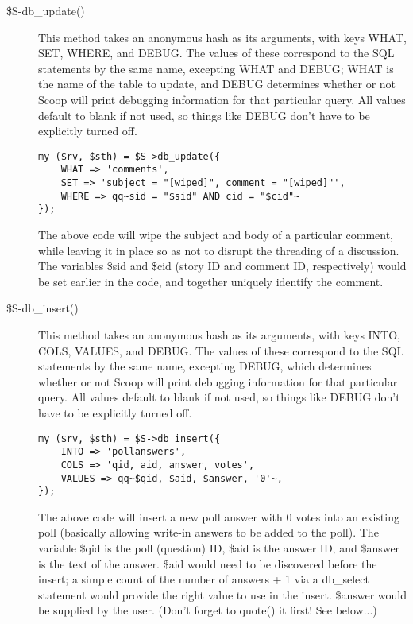 \begin{description}
\item[\$S-\latexhtml{$>$}{>}db\_update()] This method takes an anonymous hash as its arguments, with keys WHAT, SET, WHERE, and DEBUG. The values of these correspond to the SQL statements by the same name, excepting WHAT and DEBUG; WHAT is the name of the table to update, and DEBUG determines whether or not Scoop will print debugging information for that particular query. All values default to blank if not used, so things like DEBUG don't have to be explicitly turned off.
\begin{verbatim}
my ($rv, $sth) = $S->db_update({
	WHAT => 'comments',
	SET => 'subject = "[wiped]", comment = "[wiped]"',
	WHERE => qq~sid = "$sid" AND cid = "$cid"~
});
\end{verbatim}
The above code will wipe the subject and body of a particular comment, while leaving it in place so as not to disrupt the threading of a discussion. The variables \$sid and \$cid (story ID and comment ID, respectively) would be set earlier in the code, and together uniquely identify the comment.

\item[\$S-\latexhtml{$>$}{>}db\_insert()] This method takes an anonymous hash as its arguments, with keys INTO, COLS, VALUES, and DEBUG. The values of these correspond to the SQL statements by the same name, excepting DEBUG, which determines whether or not Scoop will print debugging information for that particular query. All values default to blank if not used, so things like DEBUG don't have to be explicitly turned off.
\begin{verbatim}
my ($rv, $sth) = $S->db_insert({
	INTO => 'pollanswers',
	COLS => 'qid, aid, answer, votes',
	VALUES => qq~$qid, $aid, $answer, '0'~,
});
\end{verbatim}
The above code will insert a new poll answer with 0 votes into an existing poll (basically allowing write-in answers to be added to the poll). The variable \$qid is the poll (question) ID, \$aid is the answer ID, and \$answer is the text of the answer. \$aid would need to be discovered before the insert; a simple count of the number of answers + 1 via a db\_select statement would provide the right value to use in the insert. \$answer would be supplied by the user. (Don't forget to quote() it first! See below...)


\end{description}
